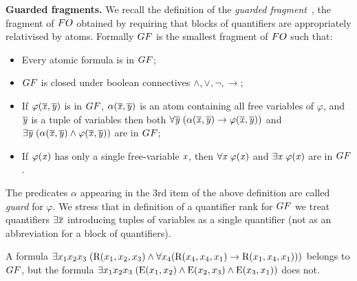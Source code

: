 \noindent \textbf{Guarded fragments.}
We recall the definition of the \emph{guarded fragment}~\cite[Sec. 4.1]{AndrekaNB98}, \ie the fragment of $\FO$ obtained by requiring that blocks of quantifiers are appropriately relativised by atoms.
Formally $\GF$ is the smallest fragment of $\FO$  such that:
\begin{itemize}\itemsep0em
    \item Every atomic formula is in $\GF$;
    \item $\GF$ is closed under boolean connectives $\land, \lor, \neg, \to$;
    \item If $\varphi(\overline{\mathit{x}}, \overline{\mathit{y}})$ is in $\GF$, $\alpha(\overline{\mathit{x}}, \overline{\mathit{y}})$ is an atom containing all free variables of $\varphi$, and $\overline{\mathit{y}}$ is a tuple of variables then both $\forall{\overline{\mathit{y}}} \; (\alpha(\overline{\mathit{x}}, \overline{\mathit{y}}) \to \varphi(\overline{\mathit{x}}, \overline{\mathit{y}}))$ and $\exists{\overline{\mathit{y}}} \; (\alpha(\overline{\mathit{x}}, \overline{\mathit{y}}) \land \varphi(\overline{\mathit{x}}, \overline{\mathit{y}}))$ are in $\GF$; 
    \item If $\varphi(\mathit{x})$ has only a single free-variable $\mathit{x}$, then $\forall{\mathit{x}}\; \varphi(\mathit{x})$ and $\exists{\mathit{x}}\; \varphi(\mathit{x})$ are in $\GF$.
\end{itemize}
The predicates $\alpha$ appearing in the 3rd item of the above definition are called \emph{guard} for $\varphi$.
We stress that in definition of a quantifier rank for $\GF$ we treat quantifiers $\exists{\overline{\mathit{x}}}$ introducing tuples of variables as a single quantifier (not as an abbreviation for a block of quantifiers).

\begin{example}
A formula $\exists{x_{1}x_{2}x_{3}}\; (\mathrm{R}(x_{1}, x_{2}, x_{3}) \land \forall x_{4}(\mathrm{R}(x_{4}, x_{4}, x_{1}) \to \mathrm{R}(x_{1}, x_{4}, x_{1})))$ belongs to $\GF$, but the formula $\exists{x_{1}x_{2}x_{3}}\; (\mathrm{E}(x_{1}, x_{2}) \land \mathrm{E}(x_{2}, x_{3}) \land \mathrm{E}(x_{3}, x_{1}))$ does not.
\end{example}

